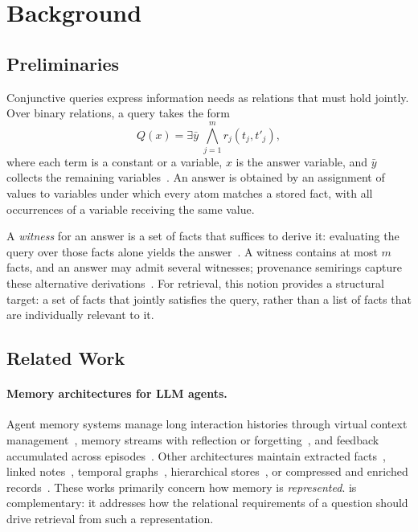 \section{Background}
\label{sec:background}

\subsection{Preliminaries}
\label{sec:preliminaries}

Conjunctive queries express information needs as relations that must
hold jointly. Over binary relations, a query takes the form
\begin{equation}
 Q(x)=\exists\bar y\;\bigwedge_{j=1}^{m}r_j(t_j,t'_j),
 \label{eq:cq}
\end{equation}
where each term is a constant or a variable, $x$ is the answer variable,
and $\bar y$ collects the remaining
variables~\cite{chandra1977conjunctive}. An answer is obtained by an
assignment of values to variables under which every atom matches a
stored fact, with all occurrences of a variable receiving the same value.

A \emph{witness} for an answer is a set of facts that suffices to derive
it: evaluating the query over those facts alone yields the
answer~\cite{buneman2001why}. A witness contains at most $m$ facts, and
an answer may admit several witnesses; provenance semirings capture these
alternative derivations~\cite{green2007provenance}. For retrieval, this
notion provides a structural target: a set of facts that jointly
satisfies the query, rather than a list of facts that are individually
relevant to it.

\subsection{Related Work}
\label{sec:related}

\paragraph{Memory architectures for LLM agents.}
Agent memory systems manage long interaction histories through virtual
context management~\cite{packer2023memgpt,lee2024readagent}, memory
streams with reflection or forgetting~\cite{park2023generative,zhong2024memorybank},
and feedback accumulated across
episodes~\cite{shinn2023reflexion,flexa2026bridging}. Other architectures
maintain extracted facts~\cite{chhikara2025mem0}, linked
notes~\cite{xu2025amem}, temporal
graphs~\cite{rasmussen2025zep,anokhin2025arigraph}, hierarchical
stores~\cite{kang2025memoryos,zhang2025gmemory}, or compressed and
enriched records~\cite{fang2026lightmem,liu2026simplemem,salama2025meminsight}.
These works primarily concern how memory is \emph{represented}. \sys is
complementary: it addresses how the relational requirements of a question
should drive retrieval from such a representation.

